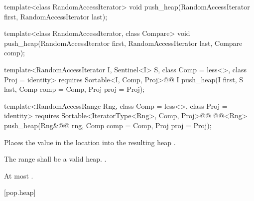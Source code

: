 %
\begin{removedblock}
\begin{itemdecl}
template<class RandomAccessIterator>
  void push_heap(RandomAccessIterator first, RandomAccessIterator last);

template<class RandomAccessIterator, class Compare>
  void push_heap(RandomAccessIterator first, RandomAccessIterator last,
                 Compare comp);
\end{itemdecl}
\end{removedblock}
\begin{addedblock}
\begin{itemdecl}
template<RandomAccessIterator I, Sentinel<I> S, class Comp = less<>,
    class Proj = identity>
  requires Sortable<I, Comp, Proj>@\newtxt{()}@
  I push_heap(I first, S last, Comp comp = Comp{}, Proj proj = Proj{});

template<RandomAccessRange Rng, class Comp = less<>, class Proj = identity>
  requires Sortable<IteratorType<Rng>, Comp, Proj>@\newtxt{()}@
  @@<Rng>
    push_heap(Rng&@\newtxt{\&}@ rng, Comp comp = Comp{}, Proj proj = Proj{});
\end{itemdecl}
\end{addedblock}

\begin{itemdescr}
\pnum
\effects
Places the value in the location
into the resulting heap
.

\pnum
\requires
The range
shall be a valid heap.
.

\begin{addedblock}
\pnum
\returns {}
\end{addedblock}

\pnum
\complexity
At most
.
\end{itemdescr}

[pop.heap]{}

